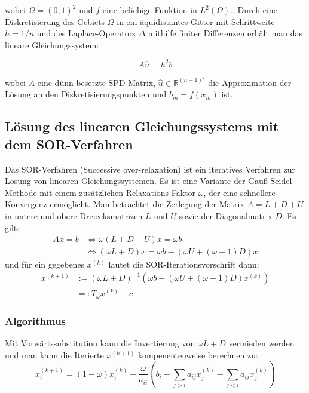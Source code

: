 \documentclass[11pt,a4paper]{article}
\begin{document}
wobei \(\Omega = (0,1)^2\) und \(f\) eine beliebige Funktion in \(L^2(\Omega)\).\cite{Projektbericht2025}.
Durch eine Diskretisierung des Gebiets \(\Omega\) in ein äquidistantes Gitter mit Schrittweite \(h = 1/n\) und des Laplace-Operators  \(\Delta\) mithilfe finiter Differenzen erhält man das lineare Gleichungssystem:

\begin{equation}
A \hat{u} = h^2 b
\label{eq:lgs}
\end{equation}

wobei \(A\) eine dünn besetzte SPD Matrix, %
\(\hat{u} \in \mathbb{R}^{(n-1)^2}\) die Approximation der Lösung an den Diskretisierungspunkten und \(b_m = f(x_m)\) ist. 

\subsection{Lösung des linearen Gleichungssystems mit dem SOR-Verfahren}

Das SOR-Verfahren (Successive over-relaxation) ist ein iteratives Verfahren zur Lösung von linearen Gleichungssystemen. Es ist eine Variante der Gauß-Seidel Methode mit einem zusätzlichen Relaxations-Faktor \(\omega\), der eine schnellere Konvergenz ermöglicht. 
Man betrachtet die Zerlegung der Matrix \(A = L + D + U\) in untere und obere Dreiecksmatrizen \(L\) und \(U\) sowie der Diagonalmatrix \(D\). Es gilt: 
\begin{align*}
    Ax = b &\iff \omega (L + D + U) x = \omega b\\
    &\iff (\omega L + D) x = \omega b - \left( \omega U + (\omega - 1) D\right) x 
\end{align*}
und für ein gegebenes \(x^{(k)}\) lautet die SOR-Iterationsvorschrift dann: 
\begin{align}
    x^{(k+1)} &:= (\omega L + D)^{-1} \left( \omega b - \left(\omega U + (\omega - 1) D\right) x^{(k)} \right)\\
    & =: T_{\omega} x^{(k)} + c
\end{align}


\subsubsection{Algorithmus}
Mit Vorwärtssubstitution kann die Invertierung von \(\omega L + D\) vermieden werden und man kann die Iterierte \(x^{(k+1)}\) kompenentenweise berechnen zu: 
\begin{equation}
    x^{(k+1)}_i = (1-\omega) x^{(k)}_i + \frac{\omega}{a_{ii}} \left(b_i - \sum_{j>i} a_{ij} x^{(k)}_j - \sum_{j<i} a_{ij} x^{(k)}_j \right)
\end{equation}
\end{document}
